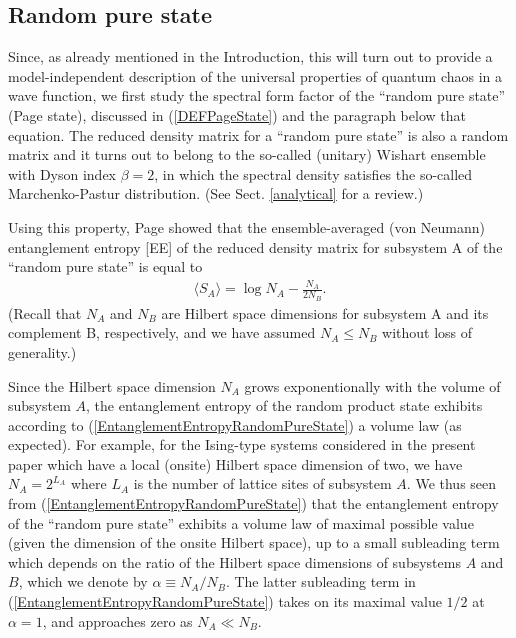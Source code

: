 \documentclass[aps,prb,preprint,onecolumn,amsmath,amssymb,superscriptaddress,eqsecnum,floatfix,scrartcl]{revtex4-1}
\begin{document}
\subsection{Random pure state}
\label{SubSectionRandomProductState}
Since, as already mentioned in the Introduction,
 this will turn out to provide a model-independent description of the universal properties of quantum chaos in a wave function,
we
first study the spectral form factor
of  the ``random pure state'' (Page state), discussed in (\ref{DEFPageState}) and the paragraph below that equation.
The reduced density matrix for a ``random pure state''  is also a random matrix and
it turns out to belong to the so-called
(unitary) 
Wishart ensemble with Dyson index
$\beta=2$, in which the spectral density satisfies
the so-called
Marchenko-Pastur distribution.\cite{loggas}
(See Sect. \ref{analytical}
for a review.)

 Using this property, Page showed\cite{Page1993}
 that the ensemble-averaged (von Neumann) entanglement entropy [EE] of the reduced density matrix for subsystem A
of the ``random pure state''  is equal to
\begin{align}
\label{EntanglementEntropyRandomPureState}
\langle S_A\rangle=\log N_A-\frac{N_A}{2N_B}.
\end{align}
(Recall that $N_A$ and $N_B$ are  Hilbert space  dimensions for subsystem A and its complement B, respectively, and we have assumed 
 $N_A\leq N_B$
without loss of generality.)

Since the Hilbert space dimension $N_A$ grows exponentionally with the volume of subsystem $A$,
the  entanglement entropy of the random product state 
exhibits
according to (\ref{EntanglementEntropyRandomPureState})
a volume law (as expected).
For example, for
 the Ising-type systems considered in the present paper which have a local (onsite) Hilbert space dimension of two,
we have $N_A=2^{L_A}$ where $L_A$ is the number of lattice sites of subsystem $A$.
We thus seen from   (\ref{EntanglementEntropyRandomPureState})
that the entanglement entropy of the ``random pure state'' exhibits a volume law of
 maximal possible value (given the dimension of the onsite Hilbert space), up to 
a small subleading 
term which depends on the ratio of the Hilbert space dimensions of subsystems $A$ and $B$,
which we denote by $\alpha\equiv N_A/N_B$. The latter 
subleading term in  (\ref{EntanglementEntropyRandomPureState})
takes on its  maximal value $1/2$ at $\alpha=1$,
 and approaches zero as  $N_A\ll N_B$.
\end{document}
